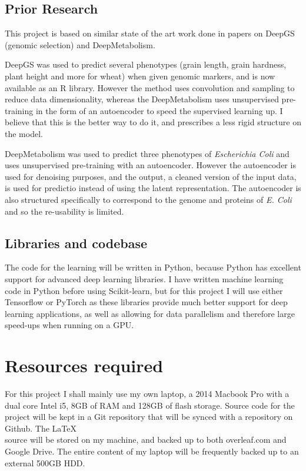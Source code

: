 \documentclass[12pt,a4paper,twoside,openany]{article}
\begin{document}
\subsection*{Prior Research}

This project is based on similar state of the art work done in papers on DeepGS\cite{DeepGS} (genomic selection) and DeepMetabolism\cite{DeepMetabolism}.

DeepGS was used to predict several phenotypes (grain length, grain hardness, plant height and more for wheat) when given genomic markers, and is now available as an R library. However the method  uses convolution and sampling to reduce data dimensionality, whereas the DeepMetabolism uses unsupervised pre-training in the form of an autoencoder to speed the supervised learning up. I believe that this is the better way to do it, and prescribes a less rigid structure on the model.

DeepMetabolism was used to predict three phenotypes of \textit{Escherichia Coli} and uses unsupervised pre-training with an autoencoder. However the autoencoder is used for denoising purposes, and the output, a cleaned version of the input data, is used for predictio instead of using the latent representation. The autoencoder is also structured specifically to correspond to the genome and proteins of \textit{E. Coli} and so the re-usability is limited.

\subsection*{Libraries and codebase}

The code for the learning will be written in Python, because Python has excellent support for advanced deep learning libraries. I have written machine learning code in Python before using Scikit-learn, but for this project I will use either Tensorflow or PyTorch as these libraries provide much better support for deep learning applications, as well as allowing for data parallelism and therefore large speed-ups when running on a GPU.

\section*{Resources required}

For this project I shall mainly use my own laptop, a 2014 Macbook Pro with a dual core Intel i5, 8GB of RAM and 128GB of flash storage. Source code for the project will be kept in a Git repository that will be synced with a repository on Github. The \LaTeX\\ source will be stored on my machine, and backed up to both overleaf.com and Google Drive. The entire content of my laptop will be frequently backed up to an external 500GB HDD.
\end{document}
